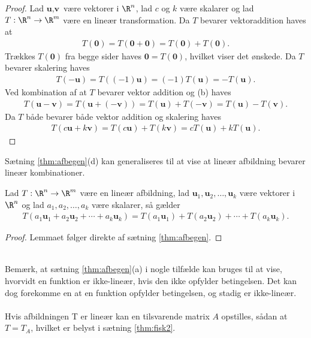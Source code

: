 %
\begin{proof}
Lad $\textbf{u}, \textbf{v}$ være vektorer i $\R^n$, lad $c$ og $k$ være skalarer og lad $T: \R^n \rightarrow \R^m$ være en lineær transformation.
Da $T$ bevarer vektoraddition haves at
%
\begin{align*}
T(\textbf{0}) = T(\textbf{0} + \textbf{0}) = T(\textbf{0}) + T(\textbf{0}).
\end{align*}
%
Trækkes $T(\textbf{0})$ fra begge sider haves $\textbf{0} = T(\textbf{0})$, hvilket viser det ønskede.
%
Da $T$ bevarer skalering haves
% 
\begin{align*}
T(-\textbf{u}) = T((-1)\textbf{u}) = (-1)T(\textbf{u}) = -T(\textbf{u}).
\end{align*}
%
Ved kombination af at $T$ bevarer vektor addition og (b) haves
%
\begin{align*}
T(\textbf{u}-\textbf{v}) = T(\textbf{u}+(-\textbf{v})) = T(\textbf{u})+T(-\textbf{v}) = T(\textbf{u}) - T(\textbf{v}).
\end{align*}
%
Da $T$ både bevarer både vektor addition og skalering haves 
%
\begin{align*}
T(c\textbf{u} + k\textbf{v}) = T(c\textbf{u}) + T(k\textbf{v}) = cT(\textbf{u}) + kT(\textbf{u}).
\end{align*}
\end{proof}
%
Sætning \ref{thm:afbegen}(d) kan generaliseres til at vise at lineær afbildning bevarer lineær kombinationer.
%
\begin{lem}{}{}
Lad $T:\R^n \rightarrow \R^m$ være en lineær afbildning, lad      $\textbf{u}_1,\textbf{u}_2,\ldots,\textbf{u}_k$ være vektorer i $\R^n$ og lad $a_1,a_2,\ldots,a_k$ være skalarer, så gælder
%
\begin{align*}
T(a_1\textbf{u}_1 + a_2\textbf{u}_2 + \cdots + a_k\textbf{u}_k) = T(a_1\textbf{u}_1) + T(a_2\textbf{u}_2) + \cdots + T(a_k\textbf{u}_k).
\end{align*}
%
\end{lem}
%
\begin{proof}
Lemmaet følger direkte af sætning \ref{thm:afbegen}.
\end{proof}
\\
%
Bemærk, at sætning \ref{thm:afbegen}(a) i nogle tilfælde kan bruges til at vise, hvorvidt en funktion er ikke-lineær, hvis den ikke opfylder betingelsen. 
Det kan dog forekomme en at en funktion opfylder betingelsen, og stadig er ikke-lineær.
% 
\\\\
% 
Hvis afbildningen T er lineær kan en tilsvarende matrix $A$ opstilles, sådan at $T=T_A$, hvilket er belyst i sætning \ref{thm:fisk2}.

